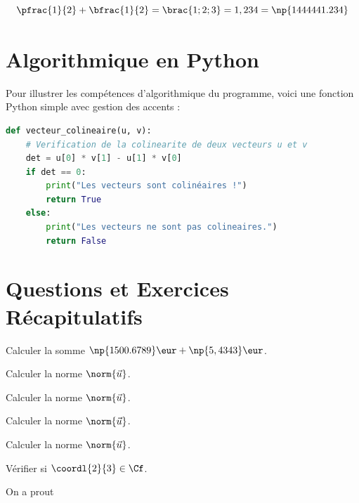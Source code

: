 $$\pfrac{1}{2}+\bfrac{1}{2}=\brac{1;2;3}=1,234=\np{1444441.234}$$

\section{Algorithmique en Python}

Pour illustrer les compétences d'algorithmique du programme, voici une fonction Python simple avec gestion des accents :

\begin{lstlisting}[language=Python]
def vecteur_colineaire(u, v):
    # Verification de la colinearite de deux vecteurs u et v
    det = u[0] * v[1] - u[1] * v[0]
    if det == 0:
        print("Les vecteurs sont colinéaires !")
        return True
    else:
        print("Les vecteurs ne sont pas colineaires.")
        return False
\end{lstlisting}

\section{Questions et Exercices Récapitulatifs}

\be %
\item Calculer la somme $\np{1500.6789} \eur + \np{5,4343} \eur$.
\item Calculer la norme $\norm{\vec{u}}$.
\item Calculer la norme $\norm{\vec{u}}$.
\item Calculer la norme $\norm{\vec{u}}$.
\item Calculer la norme $\norm{\vec{u}}$.
\item Vérifier si $\coordl{2}{3} \in \Cf$.
\ee
\emc

On a \Cf \Cg \Ch prout

